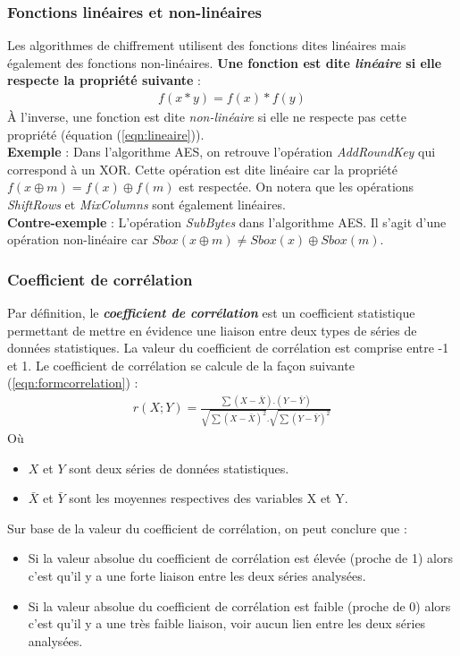 \documentclass[10pt, oneside, a4paper]{article}
\begin{document}
\subsubsection{Fonctions linéaires et non-linéaires}
\label{lineaire}
Les algorithmes de chiffrement utilisent des fonctions dites linéaires mais également des fonctions non-linéaires. \textbf{Une fonction est dite \textit{linéaire} si elle respecte la propriété suivante} : 
\begin{gather}
	f(x*y) = f(x)*f(y)\label{eqn:lineaire}
\end{gather}
À l'inverse, une fonction est dite \textit{non-linéaire} si elle ne respecte pas cette propriété (équation (\ref{eqn:lineaire})). \vspace{0.2 cm} \\
\hspace{-0.5 cm} \textbf{Exemple} : Dans l'algorithme AES, on retrouve l'opération \textit{AddRoundKey} qui correspond à un XOR. Cette opération est dite linéaire car la propriété $f(x\oplus m) = f(x) \oplus f(m)$ est respectée. On notera que les opérations \textit{ShiftRows} et \textit{MixColumns} sont également linéaires. \\
\textbf{Contre-exemple} : L'opération \textit{SubBytes} dans l'algorithme AES. Il s'agit d'une opération non-linéaire car $Sbox(x\oplus m) \neq Sbox(x) \oplus Sbox(m)$. 

\subsubsection{Coefficient de corrélation}
\label{subsec:correlation}
Par définition, le \textbf{\textit{coefficient de corrélation}} est un coefficient statistique permettant de mettre en évidence une liaison entre deux types de séries de données statistiques. La valeur du coefficient de corrélation est comprise entre -1 et 1. Le coefficient de corrélation se calcule de la façon suivante (\ref{eqn:formcorrelation}) :
\begin{gather}
	r(X;Y) = \frac{\sum(X-\bar{X}).(Y-\bar{Y}) }{\sqrt{\sum(X-\bar{X})^2}.\sqrt{\sum(Y-\bar{Y})^2}}\label{eqn:formcorrelation}
\end{gather}
Où 
\begin{itemize}
\item $X$ et $Y$ sont deux séries de données statistiques.
\item $\bar{X}$ et $\bar{Y}$ sont les moyennes respectives des variables X et Y.\vspace{0.4 cm}
\end{itemize}
Sur base de la valeur du coefficient de corrélation, on peut conclure que :
\begin{itemize}
\item Si la valeur absolue du coefficient de corrélation est élevée (proche de 1) alors c'est qu'il y a une forte liaison entre les deux séries analysées.
\item Si la valeur absolue du coefficient de corrélation est faible (proche de 0) alors c'est qu'il y a une très faible liaison, voir aucun lien entre les deux séries analysées.
\end{itemize}
\end{document}
